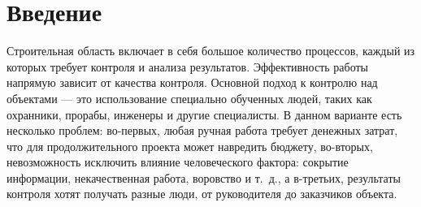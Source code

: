 
\section*{Введение}
\thispagestyle{withCompileDate}








Строительная область включает в себя большое количество процессов, каждый из которых требует контроля и анализа результатов.
Эффективность работы напрямую зависит от качества контроля. Основной подход к контролю над объектами --- это использование специально обученных людей,
таких как охранники, прорабы, инженеры и другие специалисты. В данном варианте есть несколько проблем: во-первых, любая ручная работа требует денежных затрат,
что для продолжительного проекта может навредить бюджету, во-вторых, невозможность исключить влияние человеческого фактора:
сокрытие информации, некачественная работа, воровство и т.~д., а в-третьих, результаты контроля хотят получать разные люди,
от руководителя до заказчиков объекта.

